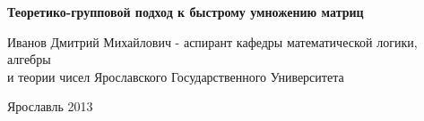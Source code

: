 \begin{titlepage}
	\begin{center}
	
	\vspace{12em}
	
	\textbf{\Large Теоретико-групповой подход к быстрому умножению матриц}
	\vspace{1em}
	
	Иванов Дмитрий Михайлович - аспирант кафедры математической логики, алгебры\\
	и теории чисел Ярославского Государственного Университета

	\vspace{\fill}

	Ярославль 2013
	\end{center}
\end{titlepage}
